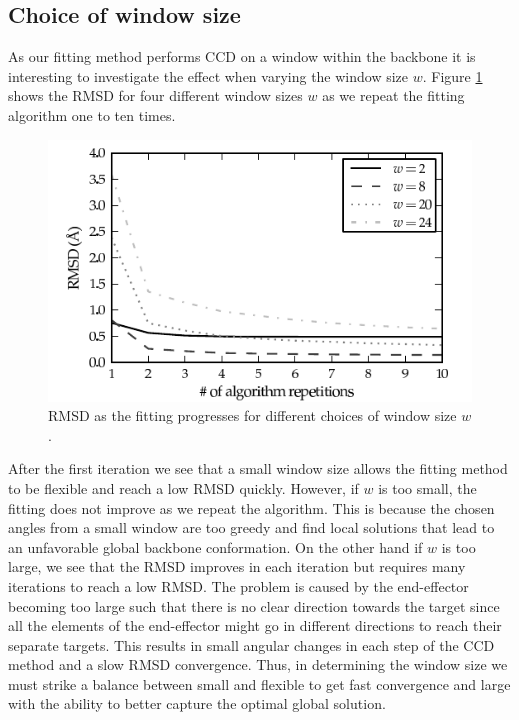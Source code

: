 \subsection{Choice of window size}
As our fitting method performs CCD on a window within the backbone it is interesting to investigate the effect when varying the window size $w$.
Figure \ref{fig:rmsd_convergence} shows the RMSD for four different window sizes $w$ as we repeat the fitting algorithm one to ten times.
\begin{figure}
	\centering
	\hspace*{-3.5mm}\includegraphics[width=1.1\columnwidth]{figures/plot_rmsd_convergence}
	\caption{RMSD as the fitting progresses for different choices of window size $w$.}
	\label{fig:rmsd_convergence}
\end{figure}
After the first iteration we see that a small window size allows the fitting method to be flexible and reach a low RMSD quickly.
However, if $w$ is too small, the fitting does not improve as we repeat the algorithm.
This is because the chosen angles from a small window are too greedy and find local solutions that lead to an unfavorable global backbone conformation.
On the other hand if $w$ is too large, we see that the RMSD improves in each iteration but requires many iterations to reach a low RMSD.
The problem is caused by the end-effector becoming too large such that there is no clear direction towards the target since all the elements of the end-effector might go in different directions to reach their separate targets.
This results in small angular changes in each step of the CCD method and a slow RMSD convergence.
Thus, in determining the window size we must strike a balance between small and flexible to get fast convergence and large with the ability to better capture the optimal global solution.
